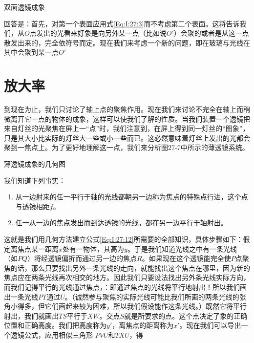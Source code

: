 \documentclass[11pt,oneside]{book}
\begin{document}
\begin{common-format}
\begin{fig}{双面透镜成象}
\label{fig:双面透镜成象}
\end{fig}

回答是：首先，对第一个表面应用式\ref{Eq:I:27:3}而不考虑第二个表面。这将告诉我们，从$ O $点发出的光看来好象是向另外某一点（比如说$ O' $）会聚的或者是从这一点散发出来的，完全依符号而定。现在我们来考虑一个新的问题，即在玻璃与光线在其中会聚到某一点$ O' $

\section{放大率}
到现在为止，我们只讨论了轴上点的聚焦作用。现在我们来讨论不完全在轴上而稍微离开它一点的物体的成象，这样可以使我们了解的性质。当我们装置一个透镜把来自灯丝的光聚焦在屏上一“点”时，我们注意到，在屏上得到同一灯丝的“图象”，只是其大小比实际的灯丝大一些或小一些而已。这必然意味着灯丝上发出的光都会聚到一焦点上。为了更好地理解这一点，我们来分析图27-7中所示的薄透镜系统。

\begin{fig}{薄透镜成象的几何图}
\label{fig:薄透镜成象的几何图}
\end{fig}

我们知道下列事实：
\begin{enumerate}
\renewcommand{\labelenumi}{(\arabic{enumi})}
\item 从一边射来的任一平行于轴的光线都朝另一边称为焦点的特殊点行进，这个点与透镜相距$ f $。
\item 任一从一边的焦点发出而到达透镜的光线，都在另一边平行于轴射出。
\end{enumerate}

这就是我们用几何方法建立公式\ref{Eq:I:27:12}所需要的全部知识，具体步骤如下：假定离焦点某一距离$ x $处有一物体，其高为$ y $。于是我们知道光线之中有一条光线（如$ PQ $）将经透镜偏折而通过另一边的焦点$ R $。如果现在这个透镜能完全使$ P $点聚焦的话，那么只要找出另外一条光线的走向，就能找出这个焦点在哪里，因为新的焦点应在两条光线再次相交的地方。因此我们只要设法找出另外条光线实际方向，而我们记得平行的光线通过焦点，：即通过焦点的光线将平行地射出！所以我们画出一条光线$ PT $通过$ U $。（诚然参与聚焦的实际光线可能比我们所画的两条光线的张角小得多，但它们画起来较为困难，所以我们假设能作这条光线。）既然它将平行射出，我们就画出$ TS $平行于$ XW $。交点$ S $就是所要求的点。这个点决定了象的正确位置和正确高度。我们把高度称为$ y' $，离焦点的距离称为$ x' $。现在我们可以导出一个透镜公式，应用相似三角形 $  PVU $和$  TXU $，得


\end{common-format}
\end{document}
